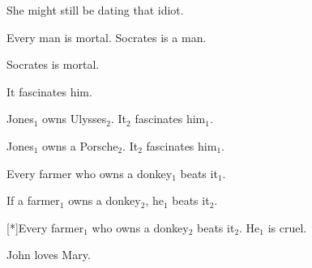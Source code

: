 \Annexes


\label{chap:list-of-examples}

\begin{exe}
   She might still be dating that idiot.
  \dotfill \pageref{ex:intro}
\end{exe}

\begin{exe}
   Every man is mortal. Socrates is a man.
  \dotfill \pageref{ex:syllogism-hypothesis}
\end{exe}

\begin{exe}
   Socrates is mortal.
  \dotfill \pageref{ex:syllogism-conclusion}
\end{exe}

\begin{exe}
   It fascinates him.
  \dotfill \pageref{ex:no-antecedent}
\end{exe}

\begin{exe}
   Jones$_1$ owns Ulysses$_2$. It$_2$ fascinates him$_1$.
  \dotfill \pageref{ex:ulysses}
\end{exe}

\begin{exe}
   Jones$_1$ owns a Porsche$_2$. It$_2$ fascinates him$_1$.
  \dotfill \pageref{ex:jones-porsche}
\end{exe}

\begin{exe}
   Every farmer who owns a donkey$_1$ beats it$_1$.
  \dotfill \pageref{ex:donkey-rc}
\end{exe}

\begin{exe}
   If a farmer$_1$ owns a donkey$_2$, he$_1$ beats it$_2$.
  \dotfill \pageref{ex:donkey-if}
\end{exe}

\begin{exe}
  [*]{Every farmer$_1$ who owns a donkey$_2$ beats
    it$_2$. He$_1$ is cruel.
  \dotfill \pageref{ex:donkey-cruel}}
\end{exe}

\begin{exe}
   John loves Mary.
  \dotfill \pageref{ex:trivial}
\end{exe}

